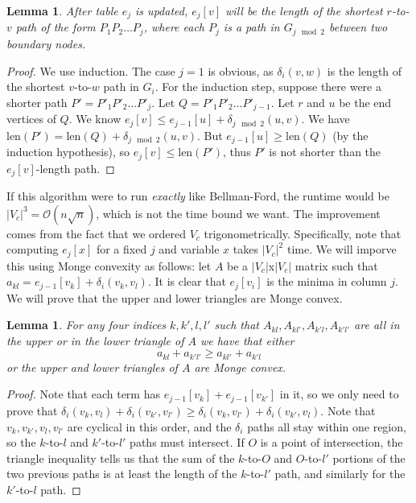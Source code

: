 \documentclass[11pt]{article}
\newtheorem{lemma}[theorem]{Lemma}
\begin{document}
\begin{lemma}
After table $e_j$ is updated, $e_j[v]$ will be the length of the shortest $r$-to-$v$ path of the form $P_1P_2\ldots P_j$, where each $P_j$ is a path in $G_{j\mod 2}$ between two boundary nodes.
\end{lemma}

\begin{proof}
We use induction. The case $j=1$ is obvious, as $\delta_i(v,w)$ is the length of the shortest $v$-to-$w$ path in $G_i$. For the induction step, suppose there were a shorter path $P' = P'_1P'_2\ldots P'_j$. Let $Q = P'_1P'_2\ldots P'_{j-1}$. Let $r$ and $u$ be the end vertices of $Q$. We know $e_j[v] \leq e_{j-1}[u] + \delta_{j\mod 2}(u,v)$. We have $\text{len}(P') = \text{len}(Q) + \delta_{j\mod 2}(u,v)$. But $e_{j-1}[u]\geq \text{len}(Q)$ (by the induction hypothesis), so $e_j[v]\leq \text{len}(P')$, thus $P'$ is not shorter than the $e_j[v]$-length path.
\end{proof}

If this algorithm were to run \textit{exactly} like Bellman-Ford, the runtime would be $|V_c|^3 = \mathcal{O}(n\sqrt{n})$, which is not the time bound we want. The improvement comes from the fact that we ordered $V_c$ trigonometrically. Specifically, note that computing $e_j[x]$ for a fixed $j$ and variable $x$ takes $|V_c|^2$ time. We will imporve this using Monge convexity as follows: let $A$ be a $|V_c|$x$|V_c|$ matrix such that $a_{kl} = e_{j-1}[v_k]+\delta_i(v_k,v_l)$. It is clear that $e_j[v_i]$ is the minima in column $j$. We will prove that the upper and lower triangles are Monge convex.\\

\begin{lemma}
For any four indices $k,k',l,l'$ such that $A_{kl}, A_{kl'}, A_{k'l}, A_{k'l'}$ are all in the upper or in the lower triangle of $A$ we have that either $$a_{kl}+a_{k'l'} \geq a_{kl'}+a_{k'l}$$ or the upper and lower triangles of $A$ are Monge convex.
\end{lemma}

\begin{proof}
Note that each term has $e_{j-1}[v_k] + e_{j-1}[v_{k'}]$ in it, so we only need to prove that $\delta_i(v_k,v_l) + \delta_i(v_{k'},v_{l'}) \geq \delta_i(v_k,v_{l'})+\delta_i(v_{k'},v_l)$. Note that $v_k,v_{k'},v_l,v_{l'}$ are cyclical in this order, and the $\delta_i$ paths all stay within one region, so the $k$-to-$l$ and $k'$-to-$l'$ paths must intersect. If $O$ is a point of intersection, the triangle inequality tells us that the sum of the $k$-to-$O$ and $O$-to-$l'$ portions of the two previous paths is at least the length of the $k$-to-$l'$ path, and similarly for the $k'$-to-$l$ path. 
\end{proof}
\end{document}
